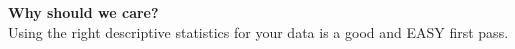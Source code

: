 \documentclass[aspectratio=169]{beamer}
\theoremstyle{principle}
\begin{document}

\begin{frame}

\begin{center}
\Huge\textbf{Why should we care?}\\
\bigskip
\bigskip
\large Using the right descriptive statistics for your data is a good and EASY first pass.\\
\end{center}

\end{frame}
\end{document}
